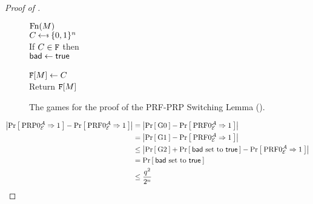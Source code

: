 \begin{proof}[Proof of ]
\begin{figure}
{	 		\underline{$\textnormal{Fn}(M)$}\\
	 		$C \getsr \bits^n$\\
	 		If $C \in \mathtt{F}$ then\\
	 		\ind $\mathsf{bad}\gets\mathsf{true}$\\
	 		\ind {}\\
	 		$\mathtt{F}[M] \gets C$\\
	 		Return $\mathtt{F}[M]$
	 	}
	 	\caption{The games for the proof of the PRF-PRP Switching Lemma ().}
	 	\label{fig:switching}	
	 \end{figure} 
	 
	 \begin{align*}
	 \left| \Pr\left[\: \textnormal{PRP}0_{\cal E}^{\mathcal A}\Rightarrow 1 \:\right] 
	 - \Pr\left[\: \textnormal{PRF}0_{\cal E}^{\mathcal A}\Rightarrow1 \:\right] \right|  
	 &=  \left|\Pr\left[\: {{\textnormal G}}0 \:\right] - \Pr\left[\: \textnormal{PRF}0_{\cal E}^{\mathcal A}\Rightarrow1 \:\right] \right|  \\
	 &=  \left|\Pr\left[\: {{\textnormal G}}1 \:\right] - \Pr\left[\: \textnormal{PRF}0_{\cal E}^{\mathcal A}\Rightarrow1 \:\right] \right|  \\
	 &\le \left|\Pr\left[\: {{\textnormal G}}2 \:\right] + \Pr\left[\: \mathsf{bad} \text{ set to } \mathsf{true} \:\right] - \Pr\left[\: \textnormal{PRF}0_{\cal E}^{\mathcal A}\Rightarrow1 \:\right] \right|\\
	 &= \Pr\left[\: \mathsf{bad} \text{ set to } \mathsf{true} \:\right]\\
	 &\le \frac{q^2}{2^n} \\
	 \end{align*} 
\end{proof}